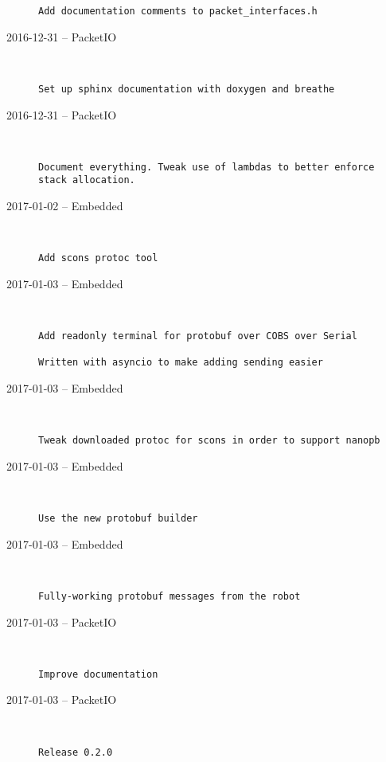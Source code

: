 \begin{description}
\begin{lstlisting}
Add documentation comments to packet_interfaces.h
\end{lstlisting}


  \item[2016-12-31 -- PacketIO] \hfill \
\begin{lstlisting}
Set up sphinx documentation with doxygen and breathe
\end{lstlisting}


  \item[2016-12-31 -- PacketIO] \hfill \
\begin{lstlisting}
Document everything. Tweak use of lambdas to better enforce stack allocation.
\end{lstlisting}


  \item[2017-01-02 -- Embedded] \hfill \
\begin{lstlisting}
Add scons protoc tool
\end{lstlisting}


  \item[2017-01-03 -- Embedded] \hfill \
\begin{lstlisting}
Add readonly terminal for protobuf over COBS over Serial

Written with asyncio to make adding sending easier
\end{lstlisting}


  \item[2017-01-03 -- Embedded] \hfill \
\begin{lstlisting}
Tweak downloaded protoc for scons in order to support nanopb
\end{lstlisting}


  \item[2017-01-03 -- Embedded] \hfill \
\begin{lstlisting}
Use the new protobuf builder
\end{lstlisting}


  \item[2017-01-03 -- Embedded] \hfill \
\begin{lstlisting}
Fully-working protobuf messages from the robot
\end{lstlisting}


  \item[2017-01-03 -- PacketIO] \hfill \
\begin{lstlisting}
Improve documentation
\end{lstlisting}


  \item[2017-01-03 -- PacketIO] \hfill \
\begin{lstlisting}
Release 0.2.0
\end{lstlisting}



\end{description}
